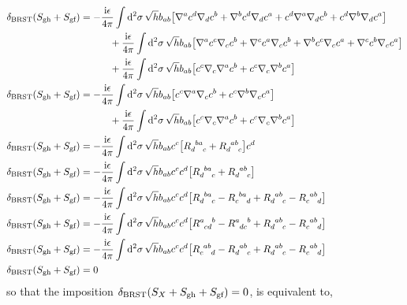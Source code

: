 \begin{align*}
    \delta_{\textnormal{BRST}}\qty(S_{\textnormal{gh}}+S_{\textnormal{gf}})&=-\frac{\im\epsilon}{4\pi}\int\dd[2]{\sigma}\sqrt{h}b_{ab}\qty[\nabla^{a}c^d\nabla_dc^{b}+\nabla^{b}c^d\nabla_dc^{a}+c^d\nabla^{a}\nabla_dc^{b}+c^d\nabla^{b}\nabla_dc^{a}]\\
    &\quad\quad\quad+\frac{\im\epsilon}{4\pi}\int\dd[2]{\sigma}\sqrt{h}b_{ab}\qty[\nabla^{a}c^{c}\nabla_cc^b+\nabla^{c}c^{a}\nabla_cc^b+\nabla^{b}c^{c}\nabla_cc^a+\nabla^{c}c^{b}\nabla_cc^a]\\
    &\quad\quad\quad+\frac{\im\epsilon}{4\pi}\int\dd[2]{\sigma}\sqrt{h}b_{ab}\qty[c^c\nabla_c\nabla^{a}c^{b}+ c^c\nabla_c\nabla^{b}c^{a}]\\
    \delta_{\textnormal{BRST}}\qty(S_{\textnormal{gh}}+S_{\textnormal{gf}})&=-\frac{\im\epsilon}{4\pi}\int\dd[2]{\sigma}\sqrt{h}b_{ab}\qty[c^c\nabla^{a}\nabla_cc^{b}+c^c\nabla^{b}\nabla_cc^{a}]\\
    &\quad\quad\quad+\frac{\im\epsilon}{4\pi}\int\dd[2]{\sigma}\sqrt{h}b_{ab}\qty[c^c\nabla_c\nabla^{a}c^{b}+ c^c\nabla_c\nabla^{b}c^{a}]\\
    \delta_{\textnormal{BRST}}\qty(S_{\textnormal{gh}}+S_{\textnormal{gf}})&=-\frac{\im\epsilon}{4\pi}\int\dd[2]{\sigma}\sqrt{h}b_{ab}c^c\qty[\tensor{R}{_d^b^a_c}+\tensor{R}{_d^a^b_c}]c^{d}\\
    \delta_{\textnormal{BRST}}\qty(S_{\textnormal{gh}}+S_{\textnormal{gf}})&=-\frac{\im\epsilon}{4\pi}\int\dd[2]{\sigma}\sqrt{h}b_{ab}c^cc^{d}\qty[\tensor{R}{_d^b^a_c}+\tensor{R}{_d^a^b_c}]\\
    \delta_{\textnormal{BRST}}\qty(S_{\textnormal{gh}}+S_{\textnormal{gf}})&=-\frac{\im\epsilon}{4\pi}\int\dd[2]{\sigma}\sqrt{h}b_{ab}c^cc^{d}\qty[\tensor{R}{_d^b^a_c}-\tensor{R}{_c^b^a_d}+\tensor{R}{_d^a^b_c}-\tensor{R}{_c^a^b_d}]\\
    \delta_{\textnormal{BRST}}\qty(S_{\textnormal{gh}}+S_{\textnormal{gf}})&=-\frac{\im\epsilon}{4\pi}\int\dd[2]{\sigma}\sqrt{h}b_{ab}c^cc^{d}\qty[\tensor{R}{^a_c_d^b}-\tensor{R}{^a_d_c^b}+\tensor{R}{_d^a^b_c}-\tensor{R}{_c^a^b_d}]\\
    \delta_{\textnormal{BRST}}\qty(S_{\textnormal{gh}}+S_{\textnormal{gf}})&=-\frac{\im\epsilon}{4\pi}\int\dd[2]{\sigma}\sqrt{h}b_{ab}c^cc^{d}\qty[\tensor{R}{_c^a^b_d}-\tensor{R}{_d^a^b_c}+\tensor{R}{_d^a^b_c}-\tensor{R}{_c^a^b_d}]\\
    \delta_{\textnormal{BRST}}\qty(S_{\textnormal{gh}}+S_{\textnormal{gf}})&=0
\end{align*}
so that the imposition $\delta_{\textnormal{BRST}}\qty(S_X+S_{\textnormal{gh}}+S_{\textnormal{gf}})=0$, is equivalent to,